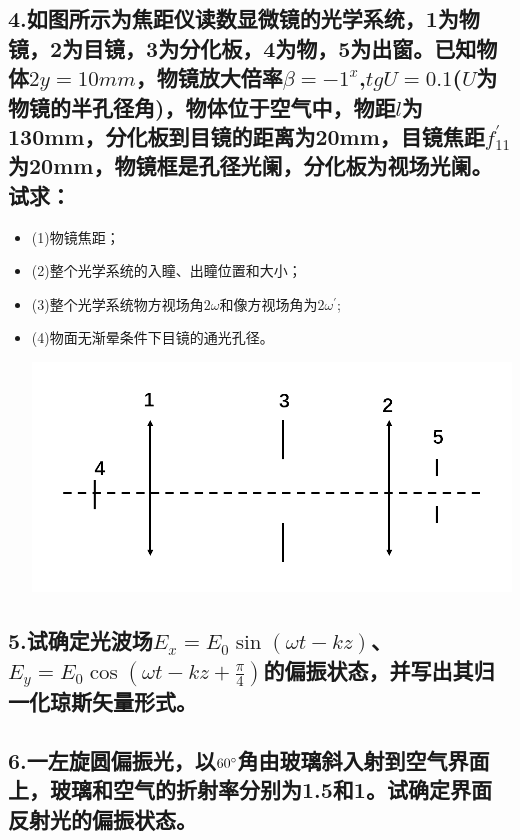 \documentclass[11pt,a4paper]{article}
\begin{document}
    \subsection*{4.如图所示为焦距仪读数显微镜的光学系统，1为物镜，2为目镜，3为分化板，4为物，5为出窗。已知物体$2y=10mm$，物镜放大倍率$\beta =-1^{x}$,$tgU=0.1$($U$为物镜的半孔径角)，物体位于空气中，物距$l$为130mm，分化板到目镜的距离为20mm，目镜焦距$f_{11}^{'}$为20mm，物镜框是孔径光阑，分化板为视场光阑。试求：}
    \begin{itemize}
        \vspace{0mm}
        \item (1)物镜焦距；
        \vspace{0mm}
        \item (2)整个光学系统的入瞳、出瞳位置和大小；
        \vspace{0mm}
        \item (3)整个光学系统物方视场角$2\omega $和像方视场角为$2\omega^{'}$;
        \vspace{0mm}
        \item (4)物面无渐晕条件下目镜的通光孔径。
        
        \includegraphics[scale=0.2]{2.png}%
    \end{itemize}
    \vspace{20mm}
    \subsection*{5.试确定光波场$E_x=E_0\sin(\omega t-kz)$、$E_y=E_0\cos (\omega t-kz+\frac{\pi}{4})$的偏振状态，并写出其归一化琼斯矢量形式。}
    \vspace{10mm}
    \subsection*{6.一左旋圆偏振光，以$60\degree $角由玻璃斜入射到空气界面上，玻璃和空气的折射率分别为1.5和1。试确定界面反射光的偏振状态。}
    \vspace{10mm}
\end{document}
